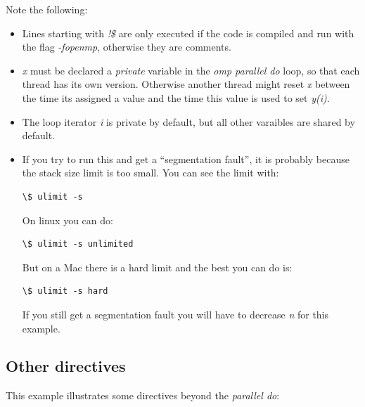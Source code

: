 \documentclass[letterpaper,10pt,english]{sphinxmanual}
\begin{document}
Note the following:
\begin{itemize}
\item {} 
Lines starting with \emph{!\$} are only executed if the code is compiled and run
with the flag \emph{-fopenmp}, otherwise they are comments.

\item {} 
\emph{x} must be declared a \emph{private} variable in the \emph{omp parallel do} loop,
so that each thread has its own version.  Otherwise another thread might
reset \emph{x} between the time its assigned a value and the time this value is
used to set \emph{y(i)}.

\item {} 
The loop iterator \emph{i} is private by default, but all other varaibles
are shared by default.

\item {} 
If you try to run this and get a ``segmentation fault'', it is probably
because the stack size limit is too small.  You can see the limit with:

\begin{Verbatim}[commandchars=\\\{\}]
\$ ulimit -s
\end{Verbatim}

On linux you can do:

\begin{Verbatim}[commandchars=\\\{\}]
\$ ulimit -s unlimited
\end{Verbatim}

But on a Mac there is a hard limit and the best you can do is:

\begin{Verbatim}[commandchars=\\\{\}]
\$ ulimit -s hard
\end{Verbatim}

If you still get a segmentation fault you will have to decrease \emph{n} for
this example.

\end{itemize}


\subsection{Other directives}
\label{openmp:other-directives}
This example illustrates some directives beyond the \emph{parallel do}:
\end{document}
